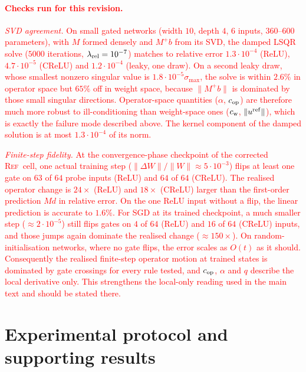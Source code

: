 \documentclass{article}
\newcommand{\nat}[1]{\textcolor{red}{#1}}
\newcommand{\TOU}{\textsc{Ref}}
\theoremstyle{definition}
\theoremstyle{remark}
\begin{document}
\paragraph{\nat{Checks run for this revision.}}
\nat{\emph{SVD agreement.} On small gated networks (width $10$, depth $4$, $6$ inputs, $360$--$600$ parameters), with $M$ formed densely and $M^+b$ from its SVD, the damped LSQR solve ($5000$ iterations, $\lambda_{\rm rel}=10^{-7}$) matches to relative error $1.3\cdot10^{-4}$ (ReLU), $4.7\cdot10^{-5}$ (CReLU) and $1.2\cdot10^{-4}$ (leaky, one draw). On a second leaky draw, whose smallest nonzero singular value is $1.8\cdot10^{-5}\sigma_{\max}$, the solve is within $2.6\%$ in operator space but $65\%$ off in weight space, because $\|M^+b\|$ is dominated by those small singular directions. Operator-space quantities ($\alpha$, $c_{\rm op}$) are therefore much more robust to ill-conditioning than weight-space ones ($c_{\rm w}$, $\|u^{\rm ref}\|$), which is exactly the failure mode described above. The kernel component of the damped solution is at most $1.3\cdot10^{-4}$ of its norm.}

\nat{\emph{Finite-step fidelity.} At the convergence-phase checkpoint of the corrected \TOU\ cell, one actual training step ($\|\Delta W\|/\|W\|\approx5\cdot10^{-3}$) flips at least one gate on $63$ of $64$ probe inputs (ReLU) and $64$ of $64$ (CReLU). The realised operator change is $24\times$ (ReLU) and $18\times$ (CReLU) larger than the first-order prediction $Md$ in relative error. On the one ReLU input without a flip, the linear prediction is accurate to $1.6\%$. For SGD at its trained checkpoint, a much smaller step ($\approx2\cdot10^{-5}$) still flips gates on $4$ of $64$ (ReLU) and $16$ of $64$ (CReLU) inputs, and those jumps again dominate the realised change ($\approx150\times$). On random-initialisation networks, where no gate flips, the error scales as $O(t)$ as it should. Consequently the realised finite-step operator motion at trained states is dominated by gate crossings for every rule tested, and $c_{\rm op}$, $\alpha$ and $q$ describe the local derivative only. This strengthens the local-only reading used in the main text and should be stated there.}




\section{Experimental protocol and supporting results}\label{app:protocol}
\end{document}
